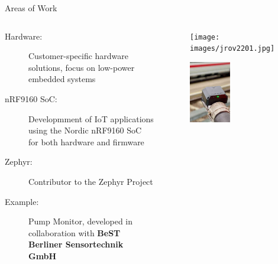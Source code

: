 \documentclass[10pt, aspectratio=169]{beamer}
\begin{document}
\begin{frame}[fragile]{Areas of Work}
  \begin{columns}
    \begin{column}{0.5\textwidth}
      \begin{description}
        \item[Hardware:] Customer-specific hardware solutions, focus on low-power embedded systems
        \item[nRF9160 SoC:] Developmment of IoT applications using the Nordic nRF9160 SoC for both hardware and firmware
        \item[Zephyr:] Contributor to the Zephyr Project
	\item[Example:] Pump Monitor, developed in collaboration with \textbf{BeST Berliner Sensortechnik GmbH}
      \end{description}
    \end{column}
    \begin{column}{0.4\textwidth}
      \begin{figure}
        \texttt{[image: images/jrov2201.jpg]}
      \end{figure}
      \begin{figure}
        \includegraphics[width=0.45\textwidth]{images/jrov2201_housing.jpg}
      \end{figure}
    \end{column}
  \end{columns}
\end{frame}
\end{document}
